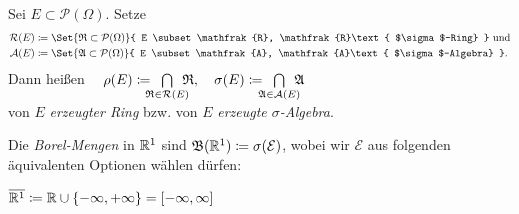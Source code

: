 \documentclass{cheat-sheet}
\newcommand{\Alg}{\mathfrak{A}} %
\newcommand{\Ring}{\mathfrak{R}} %
\newcommand{\Bor}{\mathfrak{B}} %
\renewcommand{\ER}{\overline{\R^1}} %
\begin{document}
\begin{defn}
  Sei $E \subset \mathcal{P}(\Omega)$. Setze
  \begin{align*}
    \mathcal{R}(E) &\coloneqq \Set{ \Ring \subset \mathcal{P}(\Omega) }{ E \subset \Ring, \Ring \text{ $\sigma$-Ring} } \text{ und} \\
    \mathcal{A}(E) &\coloneqq \Set{ \Alg \subset \mathcal{P}(\Omega) }{ E \subset \Alg, \Alg \text{ $\sigma$-Algebra} }.
  \end{align*}
  Dann heißen $\quad\rho(E) \coloneqq \enspace \bigcap_{\mathclap{\Ring \in \mathcal{R}(E)}} \enspace \Ring, \quad \sigma(E) \coloneqq \enspace \bigcap_{\mathclap{\Alg  \in \mathcal{A}(E)}} \enspace \Alg$\\
  von $E$ \emph{erzeugter Ring} bzw. von $E$ \emph{erzeugte $\sigma$-Algebra}.
\end{defn}

\begin{defn}
  Die \emph{Borel-Mengen} in $\mathbb{R}^1$ sind $\Bor(\R^1) \coloneqq \sigma(\mathcal{E})$, wobei wir $\mathcal{E}$ aus folgenden äquivalenten Optionen wählen dürfen:
  \begin{itemize}
  \end{itemize}
\end{defn}

\iffalse
\begin{defn}
  Allgemeiner ist für $d \in \N$ die $\sigma$-Algebra der Borel-Mengen in $\R^d$ gleich $\Bor(\R^d) \coloneqq \sigma(\mathcal{E})$, wobei
  \[ \mathcal{E} \coloneqq \Set{ \vartimes_{i=1}^d \ocinterval{a_i}{b_i} }{ \fa{i \in \{1, ..., d\}} a_i \leq b_i }. \]
\end{defn}
\fi


\begin{nota}
  $\ER \coloneqq \R \cup \{-\infty, +\infty\} = \cinterval{-\infty}{\infty}$
\end{nota}
\end{document}
